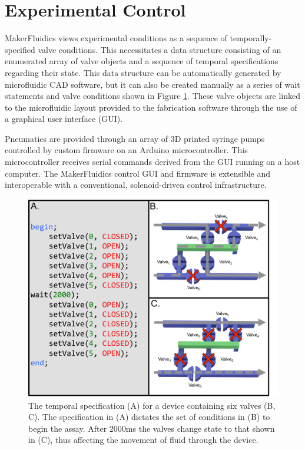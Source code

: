 \section{Experimental Control}
\label{sec:mfControl}
MakerFluidics views experimental conditions as a sequence of temporally-specified valve conditions. This necessitates a data structure consisting of an enumerated array of valve objects and a sequence of temporal specifications regarding their state. This data structure can be automatically generated by microfluidic CAD software, but it can also be created manually as a series of wait statements and valve conditions shown in Figure \ref{fig:sequence}. These valve objects are linked to the microfluidic layout provided to the fabrication software through the use of a graphical user interface (GUI).

Pneumatics are provided through an array of 3D printed syringe pumps controlled by custom firmware on an Arduino microcontroller. This microcontroller receives serial commands derived from the GUI running on a host computer. The MakerFluidics control GUI and firmware is extensible and interoperable with a conventional, solenoid-driven control infrastructure.

\begin{figure}[h]
  \begin{minipage}[t]{0.99\linewidth}\centering
    \includegraphics[width=14cm]{sequence.pdf}
    \medskip
  \end{minipage}\hfill
  \caption[Valving sequence temporal specification]{The temporal specification (A) \cite{thies2008} for a device containing six valves (B, C). The specification in (A) dictates the set of conditions in (B) to begin the assay. After 2000ms the valves change state to that shown in (C), thus affecting the movement of fluid through the device.}
    \label{fig:sequence}
\end{figure}

